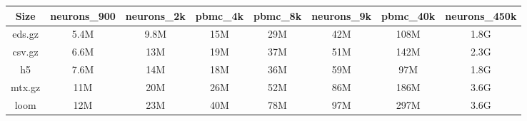 \begin{center}
 \begin{tabular}{||c || c | c | c | c | | c | c | c||} 
 \hline
 Size & neurons\_900 & neurons\_2k & pbmc\_4k & pbmc\_8k & neurons\_9k & pbmc\_40k & neurons\_450k \\ [0.5ex] 
 \hline\hline
 eds.gz & 5.4M & 9.8M & 15M & 29M & 42M & 108M & 1.8G \\ 
 \hline
 csv.gz & 6.6M & 13M & 19M & 37M & 51M & 142M & 2.3G \\
 \hline
 h5 & 7.6M & 14M & 18M & 36M & 59M & 97M & 1.8G \\
 \hline
 mtx.gz & 11M & 20M & 26M & 52M & 86M & 186M & 3.6G \\
 \hline
 loom & 12M & 23M & 40M & 78M & 97M & 297M & 3.6G \\ [1ex]
 \hline
\end{tabular}
\end{center}

